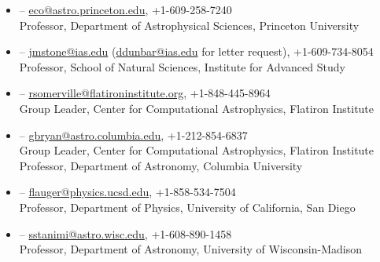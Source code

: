 \documentclass[12pt,preprint,letterpaper]{aastex63}
\begin{document}




\begin{itemize}

\item \subtitle{Eve Ostriker} --
\url{eco@astro.princeton.edu}, +1-609-258-7240\\
Professor, Department of Astrophysical Sciences, Princeton University

\item \subtitle{James Stone} --
\url{jmstone@ias.edu} (\url{ddunbar@ias.edu} for letter request), +1-609-734-8054\\
Professor, School of Natural Sciences, Institute for Advanced Study 

\item \subtitle{Rachel Somerville} --
\url{rsomerville@flatironinstitute.org}, +1-848-445-8964\\
Group Leader, Center for Computational Astrophysics, Flatiron Institute

\item \subtitle{Greg Bryan} --
\url{gbryan@astro.columbia.edu}, +1-212-854-6837\\
Group Leader, Center for Computational Astrophysics, Flatiron Institute\\
Professor, Department of Astronomy, Columbia University

\item \subtitle{Raphael Flauger} --
\url{flauger@physics.ucsd.edu}, +1-858-534-7504\\
Professor, Department of Physics, University of California, San Diego

\item \subtitle{Snezana Stanimirovi\'c} --
\url{sstanimi@astro.wisc.edu}, +1-608-890-1458\\
Professor, Department of Astronomy, University of Wisconsin-Madison



\end{itemize}
\end{document}
